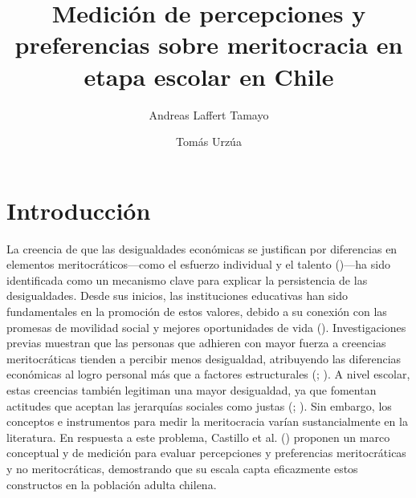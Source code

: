 \documentclass[
  12pt,
]{article}
\title{Medición de percepciones y preferencias sobre meritocracia en
etapa escolar en Chile}
\author{Andreas Laffert Tamayo}
\affil{%
                  Instituto de Sociología, Pontificia Universidad
                  Católica de Chile
              }
\author{Tomás Urzúa}
\affil{%
                  Departamento de Sociología, Universidad de Chile
              }
\date{}
\begin{document}
\maketitle

\section{Introducción}\label{introducciuxf3n}

La creencia de que las desigualdades económicas se justifican por
diferencias en elementos meritocráticos---como el esfuerzo individual y
el talento ()---ha sido
identificada como un mecanismo clave para explicar la persistencia de
las desigualdades. Desde sus inicios, las instituciones educativas han
sido fundamentales en la promoción de estos valores, debido a su
conexión con las promesas de movilidad social y mejores oportunidades de
vida (). Investigaciones
previas muestran que las personas que adhieren con mayor fuerza a
creencias meritocráticas tienden a percibir menos desigualdad,
atribuyendo las diferencias económicas al logro personal más que a
factores estructurales (;
). A nivel escolar, estas
creencias también legitiman una mayor desigualdad, ya que fomentan
actitudes que aceptan las jerarquías sociales como justas
(;
). Sin
embargo, los conceptos e instrumentos para medir la meritocracia varían
sustancialmente en la literatura. En respuesta a este problema, Castillo
et al. () proponen un
marco conceptual y de medición para evaluar percepciones y preferencias
meritocráticas y no meritocráticas, demostrando que su escala capta
eficazmente estos constructos en la población adulta chilena.
\end{document}
